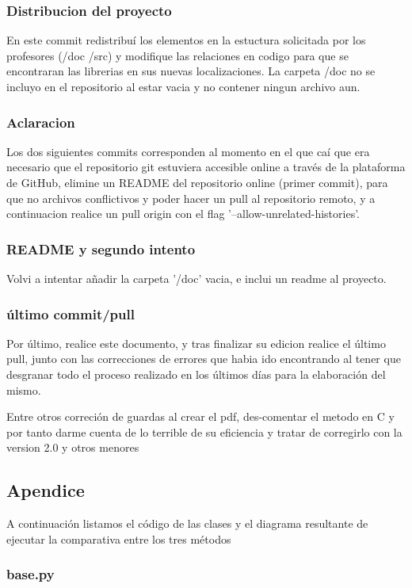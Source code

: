 \documentclass[10pt,journal,compsoc]{IEEEtran}
\begin{document}
\subsubsection{Distribucion del proyecto}
En este commit redistribuí los elementos en la estuctura solicitada por los profesores (/doc /src) y modifique las relaciones en codigo para que se encontraran las librerias en sus nuevas localizaciones. La carpeta /doc no se incluyo en el repositorio al estar vacia y no contener ningun archivo aun.

\subsubsection{Aclaracion}
Los dos siguientes commits corresponden al momento en el que caí que era necesario que el repositorio git estuviera accesible online a través de la plataforma de GitHub, elimine un README del repositorio online (primer commit), para que no archivos conflictivos y poder hacer un pull al repositorio remoto, y a continuacion realice un pull origin con el flag '--allow-unrelated-histories'.

\subsubsection{README y segundo intento}
Volvi a intentar añadir la carpeta '/doc' vacia, e inclui un readme al proyecto.

\subsubsection{último commit/pull}
Por último, realice este documento, y tras finalizar su edicion realice el último pull, junto con las correcciones de errores que habia ido encontrando al tener que desgranar todo el proceso realizado en los últimos días para la elaboración del mismo.

Entre otros correción de guardas al crear el pdf, des-comentar el metodo en C y por tanto darme cuenta de lo terrible de su eficiencia y tratar de corregirlo con la version 2.0 y otros menores

\subsection{Apendice}
A continuación listamos el código de las clases y el diagrama resultante de ejecutar la comparativa entre los tres métodos

\subsubsection{base.py}
\end{document}
